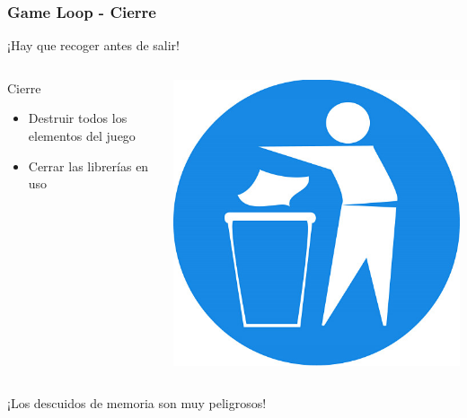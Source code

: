 \begin{frame}
\begin{columns}[c]
	\end{columns}
	
\end{frame}

\begin{frame}
	\frametitle{Game Loop - Cierre}
	
	¡Hay que recoger antes de salir!
	
	\begin{columns}[c]
	\column{175pt}
		
	\begin{block}{Cierre}
		\begin{itemize}
			\item Destruir todos los elementos del juego
			\item Cerrar las librerías en uso
		\end{itemize}            
	\end{block}
	
	\column{125pt}
	
	\begin{center}
		\includegraphics[scale=0.25]{img/tidy.jpg}
	\end{center}	
	
	\end{columns}
	
	\begin{center}
	    ¡Los descuidos de memoria son muy peligrosos!
	\end{center}
	
\end{frame}
